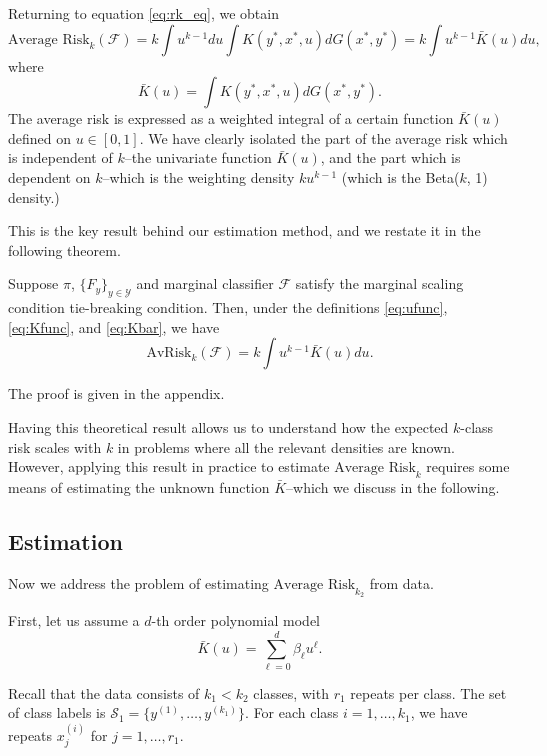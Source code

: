 \documentclass[12pt]{article}
\begin{document}
Returning to equation \eqref{eq:rk_eq}, we obtain
\[
\text{Average Risk}_k(\mathcal{F}) = k \int u^{k-1} du \int K(y^*, x^*, u) dG(x^*, y^*) = k \int u^{k-1} \bar{K}(u) du,
\]
where
\begin{equation}\label{eq:Kbar}
\bar{K}(u) = \int K(y^*, x^*, u) dG(x^*, y^*).
\end{equation}
The average risk is expressed as a weighted integral of a certain
function $\bar{K}(u)$ defined on $u \in [0,1]$.  We have clearly
isolated the part of the average risk which is independent of $k$--the
univariate function $\bar{K}(u)$, and the part which is dependent on
$k$--which is the weighting density $ku^{k-1}$ (which is the
Beta($k$, 1) density.)

This is the key result behind our estimation method, and we restate it
in the following theorem.

\begin{theorem}
Suppose $\pi$, $\{F_y\}_{y \in \mathcal{Y}}$ and marginal classifier
$\mathcal{F}$ satisfy the marginal scaling condition tie-breaking
condition.  Then, under the definitions \eqref{eq:ufunc}, \eqref{eq:Kfunc}, and \eqref{eq:Kbar}, we have
\begin{equation}\label{eq:avrisk_identity}
\text{AvRisk}_k(\mathcal{F}) = k \int u^{k-1} \bar{K}(u) du.
\end{equation}
\end{theorem}

The proof is given in the appendix.

Having this theoretical result allows us to understand how the
expected $k$-class risk scales with $k$ in problems where all the
relevant densities are known.  However, applying this result in
practice to estimate $\text{Average Risk}_k$ requires some means of
estimating the unknown function $\bar{K}$--which we discuss in the
following.

\subsection{Estimation}

Now we address the problem of estimating $\text{Average Risk}_{k_2}$
from data.  

First, let us assume a $d$-th order polynomial model
\[
\bar{K}(u) = \sum_{\ell = 0}^d \beta_\ell u^\ell.
\]

Recall that the data consists of $k_1 < k_2$ classes, with
$r_1$ repeats per class.  The set of class labels is $\mathcal{S}_1 =
\{y^{(1)},\hdots, y^{(k_1)}\}$.  For each class $i = 1,\hdots, k_1$,
we have repeats $x_j^{(i)}$ for $j = 1,\hdots, r_1$.
\end{document}
